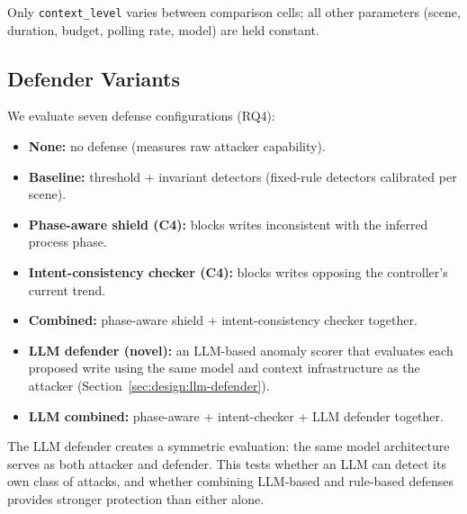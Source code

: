 Only \texttt{context\_level} varies between comparison cells; all other parameters (scene, duration, budget, polling rate, model) are held constant.

\subsection{Defender Variants}
We evaluate seven defense configurations (RQ4):
\begin{itemize}[leftmargin=1.2em]
    \item \textbf{None:} no defense (measures raw attacker capability).
    \item \textbf{Baseline:} threshold + invariant detectors (fixed-rule detectors calibrated per scene).
    \item \textbf{Phase-aware shield (C4):} blocks writes inconsistent with the inferred process phase.
    \item \textbf{Intent-consistency checker (C4):} blocks writes opposing the controller's current trend.
    \item \textbf{Combined:} phase-aware shield + intent-consistency checker together.
    \item \textbf{LLM defender (novel):} an LLM-based anomaly scorer that evaluates each proposed write using the same model and context infrastructure as the attacker (Section~\ref{sec:design:llm-defender}).
    \item \textbf{LLM combined:} phase-aware + intent-checker + LLM defender together.
\end{itemize}

The LLM defender creates a symmetric evaluation: the same model architecture serves as both attacker and defender. This tests whether an LLM can detect its own class of attacks, and whether combining LLM-based and rule-based defenses provides stronger protection than either alone.

